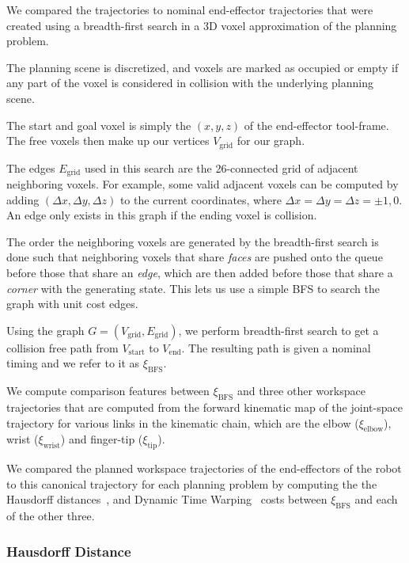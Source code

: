 \documentclass[letterpaper, 10 pt, conference]{ieeeconf}  %
\begin{document}
We compared the trajectories to nominal end-effector trajectories that were created using a breadth-first search in a 3D voxel approximation of the planning problem. 

The planning scene is discretized, and voxels are marked as occupied or empty if any part of the voxel is considered in collision with the underlying planning scene. 

The start and goal voxel is simply the $(x,y,z)$ of the end-effector tool-frame. The free voxels then make up our vertices $V_\text{grid}$ for our graph.

The edges $E_\text{grid}$ used in this search are the 26-connected grid of adjacent neighboring voxels. For example, some valid adjacent voxels can be computed by adding $(\Delta x,\Delta y,\Delta z)$ to the current coordinates, where $\Delta x= \Delta y= \Delta z= {\pm1,0}$. An edge only exists in this graph if the ending voxel is collision.

The order the neighboring voxels are generated by the breadth-first search is done such that neighboring voxels that share \emph{faces} are pushed onto the queue before those that share an \emph{edge}, which are then added before those that share a \emph{corner} with the generating state. This lets us use a simple BFS to search the graph with unit cost edges.

Using the graph $G=(V_\text{grid}, E_\text{grid})$, we perform breadth-first search to get a collision free path from $V_\text{start}$ to $V_\text{end}$. The resulting path is given a nominal timing and we refer to it as $\xi_{\text{BFS}}$. 

We compute comparison features between $\xi_{\text{BFS}}$ and three other workspace trajectories that are computed from the forward kinematic map of the joint-space trajectory for various links in the kinematic chain, which are the elbow ($\xi_\text{elbow}$), wrist ($\xi_\text{wrist}$) and finger-tip ($\xi_\text{tip}$).

We compared the planned workspace trajectories of the end-effectors of the robot to this canonical trajectory for each planning problem by computing the the Hausdorff distances~\cite{dubuisson1994modified}, and Dynamic Time Warping~\cite{senin2008dynamic} costs between $\xi_{\text{BFS}}$ and each of the other three.

\subsubsection{Hausdorff Distance}
\end{document}
